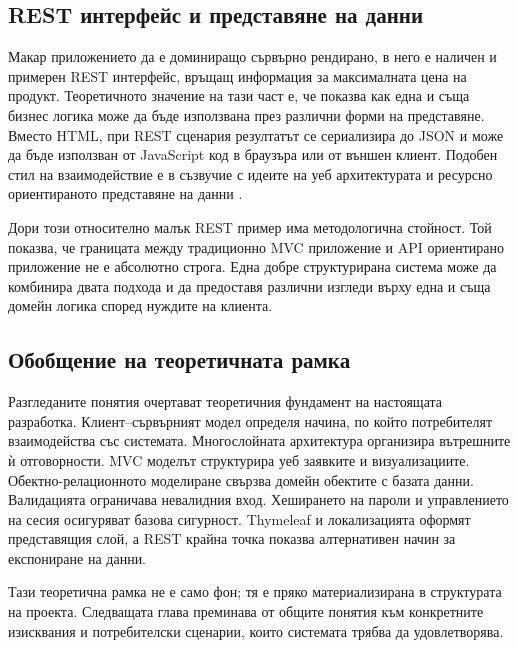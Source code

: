 \subsection{REST интерфейс и представяне на данни}

Макар приложението да е доминиращо сървърно рендирано, в него е наличен и примерен REST интерфейс, връщащ информация за максималната цена на продукт. Теоретичното значение на тази част е, че показва как една и съща бизнес логика може да бъде използвана през различни форми на представяне. Вместо HTML, при REST сценария резултатът се сериализира до JSON и може да бъде използван от JavaScript код в браузъра или от външен клиент. Подобен стил на взаимодействие е в съзвучие с идеите на уеб архитектурата и ресурсно ориентираното представяне на данни \cite{fielding}.

Дори този относително малък REST пример има методологична стойност. Той показва, че границата между традиционно MVC приложение и API ориентирано приложение не е абсолютно строга. Една добре структурирана система може да комбинира двата подхода и да предоставя различни изгледи върху една и съща домейн логика според нуждите на клиента.

\subsection{Обобщение на теоретичната рамка}

Разгледаните понятия очертават теоретичния фундамент на настоящата разработка. Клиент--сървърният модел определя начина, по който потребителят взаимодейства със системата. Многослойната архитектура организира вътрешните ѝ отговорности. MVC моделът структурира уеб заявките и визуализациите. Обектно-релационното моделиране свързва домейн обектите с базата данни. Валидацията ограничава невалидния вход. Хеширането на пароли и управлението на сесия осигуряват базова сигурност. Thymeleaf и локализацията оформят представящия слой, а REST крайна точка показва алтернативен начин за експониране на данни.

Тази теоретична рамка не е само фон; тя е пряко материализирана в структурата на проекта. Следващата глава преминава от общите понятия към конкретните изисквания и потребителски сценарии, които системата трябва да удовлетворява.
